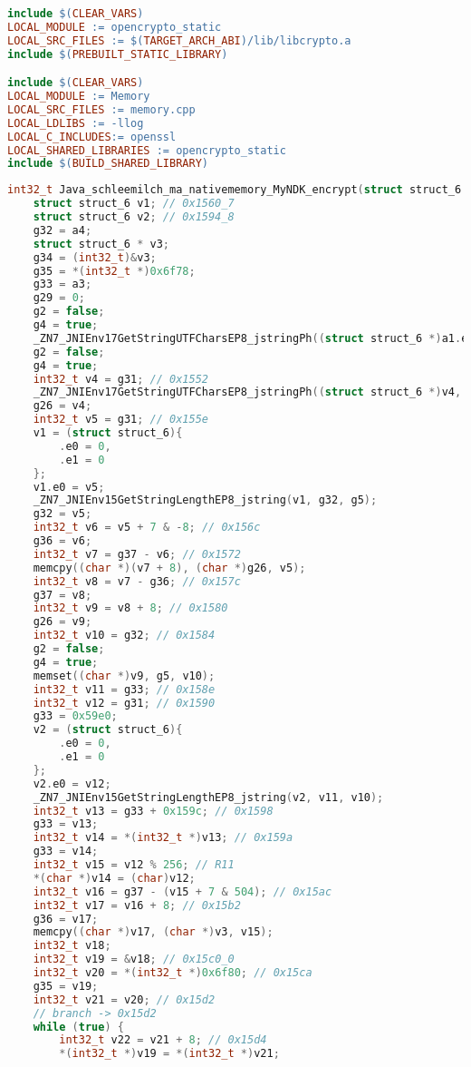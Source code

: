 \begin{appendices}
\begin{lstlisting}[language=make, caption=Memory/Android.mk, label=nkd_aes_make]
include $(CLEAR_VARS)
LOCAL_MODULE := opencrypto_static
LOCAL_SRC_FILES := $(TARGET_ARCH_ABI)/lib/libcrypto.a
include $(PREBUILT_STATIC_LIBRARY)

include $(CLEAR_VARS)
LOCAL_MODULE := Memory
LOCAL_SRC_FILES := memory.cpp
LOCAL_LDLIBS := -llog
LOCAL_C_INCLUDES:= openssl
LOCAL_SHARED_LIBRARIES := opencrypto_static
include $(BUILD_SHARED_LIBRARY)
\end{lstlisting}

\begin{lstlisting}[language=C++, caption=Decompiled AES Encrypt(), label=dec_aes_encrypt]
int32_t Java_schleemilch_ma_nativememory_MyNDK_encrypt(struct struct_6 a1, int32_t a2, int32_t a3, int32_t a4, int32_t a5, int32_t a6, int32_t a7, int32_t a8, int32_t a9, int32_t a10, int32_t a11) {
    struct struct_6 v1; // 0x1560_7
    struct struct_6 v2; // 0x1594_8
    g32 = a4;
    struct struct_6 * v3;
    g34 = (int32_t)&v3;
    g35 = *(int32_t *)0x6f78;
    g33 = a3;
    g29 = 0;
    g2 = false;
    g4 = true;
    _ZN7_JNIEnv17GetStringUTFCharsEP8_jstringPh((struct struct_6 *)a1.e0, (char *)a3);
    g2 = false;
    g4 = true;
    int32_t v4 = g31; // 0x1552
    _ZN7_JNIEnv17GetStringUTFCharsEP8_jstringPh((struct struct_6 *)v4, (char *)g32);
    g26 = v4;
    int32_t v5 = g31; // 0x155e
    v1 = (struct struct_6){
        .e0 = 0,
        .e1 = 0
    };
    v1.e0 = v5;
    _ZN7_JNIEnv15GetStringLengthEP8_jstring(v1, g32, g5);
    g32 = v5;
    int32_t v6 = v5 + 7 & -8; // 0x156c
    g36 = v6;
    int32_t v7 = g37 - v6; // 0x1572
    memcpy((char *)(v7 + 8), (char *)g26, v5);
    int32_t v8 = v7 - g36; // 0x157c
    g37 = v8;
    int32_t v9 = v8 + 8; // 0x1580
    g26 = v9;
    int32_t v10 = g32; // 0x1584
    g2 = false;
    g4 = true;
    memset((char *)v9, g5, v10);
    int32_t v11 = g33; // 0x158e
    int32_t v12 = g31; // 0x1590
    g33 = 0x59e0;
    v2 = (struct struct_6){
        .e0 = 0,
        .e1 = 0
    };
    v2.e0 = v12;
    _ZN7_JNIEnv15GetStringLengthEP8_jstring(v2, v11, v10);
    int32_t v13 = g33 + 0x159c; // 0x1598
    g33 = v13;
    int32_t v14 = *(int32_t *)v13; // 0x159a
    g33 = v14;
    int32_t v15 = v12 % 256; // R11
    *(char *)v14 = (char)v12;
    int32_t v16 = g37 - (v15 + 7 & 504); // 0x15ac
    int32_t v17 = v16 + 8; // 0x15b2
    g36 = v17;
    memcpy((char *)v17, (char *)v3, v15);
    int32_t v18;
    int32_t v19 = &v18; // 0x15c0_0
    int32_t v20 = *(int32_t *)0x6f80; // 0x15ca
    g35 = v19;
    int32_t v21 = v20; // 0x15d2
    // branch -> 0x15d2
    while (true) {
        int32_t v22 = v21 + 8; // 0x15d4
        *(int32_t *)v19 = *(int32_t *)v21;

\end{lstlisting}
\end{appendices}
